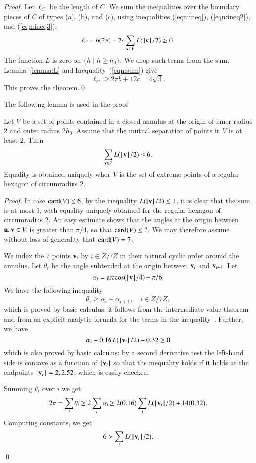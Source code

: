 \documentclass{llncs}
\begin{document}
\begin{proof}
Let $\ell_C$ be the length of $C$.  We sum the inequalities over the
boundary pieces of $C$ of types (a), (b), and (c), using inequalities
(\ref{eqn:ineq}), (\ref{eqn:ineq2}), and (\ref{eqn:ineq3}):
\begin{equation}\label{eqn:sum}
\ell_C - b (2\pi) - 2 c \sum_{{\mathbf v}\in V} L({{\hskip0.1em|\hskip-0.15em|\hskip0.1em}{\mathbf v}{\hskip0.1em|\hskip-0.15em|\hskip0.1em}}/2) \ge 0.
\end{equation}
The function $L$ is zero on $\{h \mid h\ge h_0\}$.  We drop such terms
from the sum.  Lemma~\ref{lemma:L} and Inequality~(\ref{eqn:sum}) give
\[
\ell_C \ge 2 \pi b + 12 c = 4\sqrt3.
\]
This proves the theorem.\qed
\end{proof}

The following lemma is used in the proof

\begin{lemma}\label{lemma:L}
  Let $V$ be a set of points contained in a closed annulus at the
  origin of inner radius $2$ and outer radius $2h_0$.  Assume that
  the mutual separation of points in $V$ is at least $2$.  Then
\[
\sum_{{\mathbf v}\in V} L({{\hskip0.1em|\hskip-0.15em|\hskip0.1em}{\mathbf v}{\hskip0.1em|\hskip-0.15em|\hskip0.1em}}/2) \le 6.
\]
Equality is obtained uniquely when $V$ is the set of extreme points of
a regular hexagon of circumradius $2$.
\end{lemma}

\begin{proof}
  In case ${\operatorname{card}}(V)\le 6$, by the inequality $L({{\hskip0.1em|\hskip-0.15em|\hskip0.1em}{\mathbf v}{\hskip0.1em|\hskip-0.15em|\hskip0.1em}}/2)\le 1$,
  it is clear that the sum is at most $6$, with equality uniquely
  obtained for the regular hexagon of circumradius $2$.  An easy
  estimate shows that the angles at the origin between ${\mathbf u},{\mathbf v}\in V$ is
  greater than $\pi/4$, so that ${\operatorname{card}}(V)\le 7$.  We may therefore
  assume without loss of generality that ${\operatorname{card}}(V)=7$.

We index the $7$ points ${\mathbf v}_i$ by $i\in\ring{Z}/7\ring{Z}$ in their
natural cyclic order around the annulus.  Let $\theta_i$ be the angle
subtended at the origin between ${\mathbf v}_i$ and ${\mathbf v}_{i+1}$.  Let 
\[
\alpha_i = \arccos({{\hskip0.1em|\hskip-0.15em|\hskip0.1em}{\mathbf v}{\hskip0.1em|\hskip-0.15em|\hskip0.1em}}/4) - \pi/6.
\]
We have the following inequality
\begin{equation}\label{eqn:theta-alpha}
\theta_i \ge \alpha_i + \alpha_{i+1},\quad i\in \ring{Z}/7\ring{Z},
\end{equation}
which is proved by basic calculus: it follows from the intermediate
value theorem and from an explicit analytic formula for the terms in
the inequality~\cite{DSP}.
Further, we have
\begin{equation}\label{eqn:alpha}
  \alpha_i - 0.16\, L({{\hskip0.1em|\hskip-0.15em|\hskip0.1em}{\mathbf v}_i{\hskip0.1em|\hskip-0.15em|\hskip0.1em}}/2) - 0.32 \ge0
\end{equation}
which is also proved by basic calculus: by a second derivative test
the left-hand side is concave as a function of ${{\hskip0.1em|\hskip-0.15em|\hskip0.1em}{\mathbf v}_i{\hskip0.1em|\hskip-0.15em|\hskip0.1em}}$ so that
the inequality holds if it holds at the endpoints
${{\hskip0.1em|\hskip-0.15em|\hskip0.1em}{\mathbf v}_i{\hskip0.1em|\hskip-0.15em|\hskip0.1em}}=2,2.52$, which is easily checked.

Summing $\theta_i$ over $i$ we get
\[
2\pi  = \sum_i \theta_i \ge 
2\sum_i \alpha_i \ge 2 (0.16) \sum_i L({{\hskip0.1em|\hskip-0.15em|\hskip0.1em}{\mathbf v}_i{\hskip0.1em|\hskip-0.15em|\hskip0.1em}}/2) + 14 (0.32).
\]
Computing constants, we get
\[
6 > \sum_i L({{\hskip0.1em|\hskip-0.15em|\hskip0.1em}{\mathbf v}_i{\hskip0.1em|\hskip-0.15em|\hskip0.1em}}/2).
\]
\qed
\end{proof}
\end{document}
